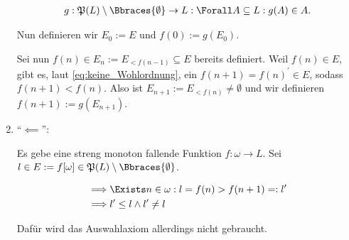 \begin{solution}
\begin{enumerate}[label = \texttt{ad}]
    \begin{align*}
        g:
        \mathfrak{P}(L) \setminus \Bbraces{\emptyset} \to L:
            \Forall A \subseteq L:
                g(A) \in A.
    \end{align*}

    Nun definieren wir $E_0 := E$ und $f(0) := g(E_0)$.

    Sei nun $f(n) \in E_{n} := E_{< f(n-1)} \subseteq E$ bereits definiert.
    Weil $f(n) \in E$, gibt es, laut \eqref{eq:keine_Wohlordnung}, ein $f(n + 1) = f(n)^\prime \in E$, sodass $f(n + 1) < f(n)$.
    Also ist $E_{n+1} := E_{<f(n)} \neq \emptyset$ und wir definieren $f(n+1) := g(E_{n+1})$.

    \item \enquote{$\impliedby$}:

    Es gebe eine streng monoton fallende Funktion $f: \omega \to L$.
    Sei $l \in E := f[\omega] \in \mathfrak{P}(L) \setminus \Bbraces{\emptyset}$.

    \begin{align*}
        \implies &
        \Exists n \in \omega:
            l = f(n) > f(n + 1) =: l^\prime \\
        \implies &
        l^\prime \leq l \land l^\prime \neq l
    \end{align*}

    Dafür wird das Auswahlaxiom allerdings nicht gebraucht.

\end{enumerate}

\end{solution}

